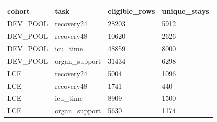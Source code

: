 \begin{tabular}{llll}
\hline
cohort & task & eligible\_rows & unique\_stays \\
\hline
DEV\_POOL & recovery24 & 28203 & 5912 \\
DEV\_POOL & recovery48 & 10620 & 2626 \\
DEV\_POOL & icu\_time & 48859 & 8000 \\
DEV\_POOL & organ\_support & 31434 & 6298 \\
LCE & recovery24 & 5004 & 1096 \\
LCE & recovery48 & 1741 & 440 \\
LCE & icu\_time & 8909 & 1500 \\
LCE & organ\_support & 5630 & 1174 \\
\hline
\end{tabular}
